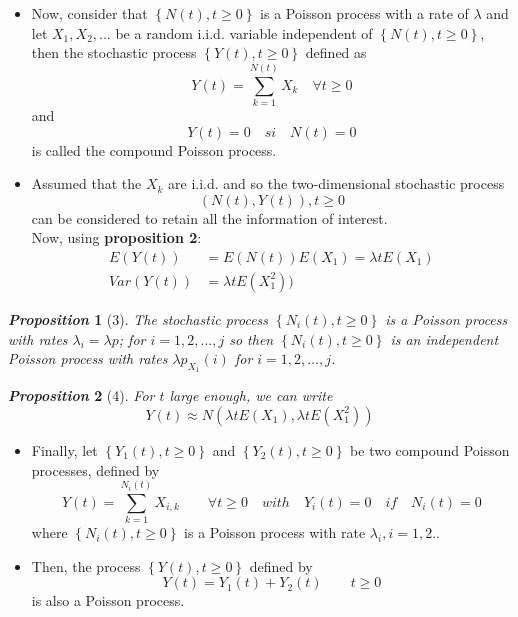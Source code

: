\documentclass[10pt]{beamer} %
\newtheorem{prop}{{\it Proposition}}[section]
\begin{document}
\begin{frame}
\begin{itemize}
\item  Now, consider that $\left\{N(t),t\geq 0\right\}$ is a Poisson process with a rate of $\lambda$ and let $X_1,X_2,...$ be a random i.i.d. variable independent of $\left\{N(t),t\geq 0\right\}$, then the stochastic process $\left\{Y(t),t\geq 0\right\}$ defined as $$Y(t)=\sum_{k=1}^{N(t)}X_k\quad \forall t\geq 0$$ and $$Y(t)=0 \quad si \quad N(t)=0$$ is called the compound Poisson process.\\
\item Assumed that the $X_k$ are i.i.d. and so the two-dimensional stochastic process $${(N(t),Y(t)),t\geq 0}$$ can be considered to retain all the information of interest.\\
Now, using \textbf{proposition 2}:
\begin{align*}
E(Y(t))&=E(N(t))E(X_1)=\lambda tE(X_1)\\
Var(Y(t))&=\lambda tE(X_1^2))
\end{align*}
\end{itemize}
\end{frame}
\begin{frame}
\begin{prop}[3]
 The stochastic process $\left\{N_i(t),t\geq0\right\}$ is a Poisson process with rates $\lambda_i=\lambda p$; for $i=1,2,...,j$ so then $\left\{N_i(t),t\geq0\right\}$ is an independent Poisson process with rates $\lambda p_{X_1}(i)$ for $i=1,2,…,j$.
\end{prop}
\vspace{1 cm}
\begin{prop}[4]
For $t$ large enough, we can write $$Y(t)\approx N(\lambda t E(X_1),\lambda t E(X^2_1))$$
\end{prop}

\end{frame}
\begin{frame}
\begin{itemize}
    \item Finally, let $\left\{Y_1(t), t\geq 0\right\}$ and $\left\{Y_2(t), t\geq 0\right\}$ be two compound Poisson processes, defined by $$Y(t)=\sum_{k=1}^{N_i(t)}X_{i,k}\quad \quad \forall t\geq 0  \quad with \quad Y_i(t)=0\quad if\quad  N_i(t)=0$$ where $\left\{N_i(t),t\geq 0\right\}$ is a Poisson process with rate $\lambda_i, i=1,2.$.
    \item Then, the process $\left\{Y(t),t\geq 0\right\}$ defined by $$Y(t)=Y_1(t)+Y_2(t)\quad \quad t\geq 0$$ is also a Poisson process.
\end{itemize}
    
\end{frame}
\end{document}
